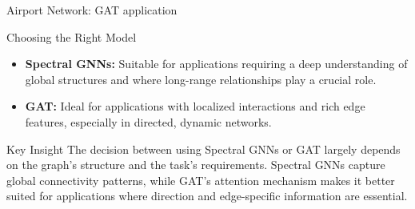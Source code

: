 \begin{frame}{Airport Network: GAT application}

    
\end{frame}

\begin{frame}{Choosing the Right Model}
    \begin{itemize}
        \item \textbf{Spectral GNNs:} Suitable for applications requiring a deep understanding of global structures and where long-range relationships play a crucial role.
        \item \textbf{GAT:} Ideal for applications with localized interactions and rich edge features, especially in directed, dynamic networks.
    \end{itemize}
    \begin{block}{Key Insight}
        The decision between using Spectral GNNs or GAT largely depends on the graph's structure and the task's requirements. Spectral GNNs capture global connectivity patterns, while GAT's attention mechanism makes it better suited for applications where direction and edge-specific information are essential.
    \end{block}
\end{frame}